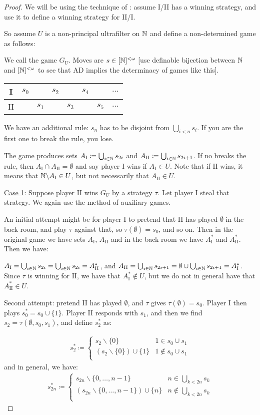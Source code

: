 \documentclass[]{article}
\newcommand{\I}{\textrm{I}}
\newcommand{\II}{\textrm{II}}
\newcommand{\lom}{{<\omega}}
\newcommand{\ad}{\textrm{AD}}
\newcommand{\gamed}[1]{
    \begin{center}
        \begin{tabular}{c|ccccccc}
            I & $#1_0$ & & $#1_2$ & & $#1_4 $& & $\dots $\\ \hline
            II & & $#1_1$ & & $#1_3 $& &$ #1_5$ & $\dots$ 
        \end{tabular}
    \end{center}
}
\begin{document}
\begin{proof}
    We will be using the technique of : assume I/II has a winning strategy, and use it to define a winning strategy for II/I.

    So assume $U$ is a non-principal ultrafilter on $\mathbb{N}$ and define a non-determined game as follows:

    We call the game $G_U$. Moves are $s \in [\N]^\lom$ [use definable bijection between $\mathbb{N}$ and $[\N]^\lom$ to see that $\ad$ implies the determinacy of games like this].

    \gamed{s}

    We have an additional rule: $s_n$ has to be disjoint from $\bigcup_{i < n}s_i$. If you are the first one to break the rule, you lose.
    
    The game produces sets $A_\I \coloneqq \bigcup_{i\in\N}s_{2i}$ and $A_\II \coloneqq \bigcup_{i\in\N}s_{2i+1}$. If no breaks the rule, then $A_\I \cap A_\II = \emptyset$ and say player I wins if $A_\I \in U$. Note that if $\II$ wins, it means that $\N\backslash A_\I \in U$, but not necessarily that $A_\II \in U$.

    \underline{Case 1}: Suppose player II wins $G_U$ by a strategy $\tau$. Let player I steal that strategy. We again use the method of auxiliary games.

    An initial attempt might be for player I to pretend that II has played $\emptyset$ in the back room, and play $\tau$ against that, so $\tau(\emptyset) = s_0$, and so on. Then in the original game we have sets $A_\I$, $A_\II$ and in the back room we have $A_\I^\ast$ and $A_\II^\ast$. Then we have:

    $A_\I = \bigcup_{i\in\N}s_{2i} = \bigcup_{i\in\N}s_{2i} = A^\ast_\II$, and $A_\II = \bigcup_{i\in\N}s_{2i+1} = \emptyset \cup \bigcup_{i\in\N}s_{2i+1} = A^\ast_\I$. Since $\tau$ is winning for $\II$, we have that $A_\I^\ast \not\in U$, but we do not in general have that $A^\ast_\II \in U$.

    Second attempt: pretend II has played $\emptyset$, and $\tau$ gives $\tau(\emptyset) = s_0$. Player I then plays $s_0^\ast = s_0 \cup\{1\}$. Player II responds with $s_1$, and then we find $s_2 = \tau(\emptyset,s_0,s_1)$, and define $s_2^\ast$ as:

    \begin{align*}
        s_2^\ast \coloneqq \left\lbrace \begin{array}{cl}s_2\backslash \{0\} & 1 \in s_0 \cup s_1\\ (s_2\backslash \{0\})\cup \{1\} & 1\not\in s_0\cup s_1\\ \end{array}\right.
    \end{align*}
    and in general, we have:
    \begin{align*}
        s_{2n}^\ast \coloneqq \left\lbrace \begin{array}{ll}s_{2n}\backslash \{0,\dots,n-1\} & n \in \bigcup_{k<2n}s_k\\ (s_{2n}\backslash \{0,\dots,n-1\})\cup \{n\} & n\not\in \bigcup_{k<2n}s_k\\ \end{array}\right.
    \end{align*}


\end{proof}
\end{document}
